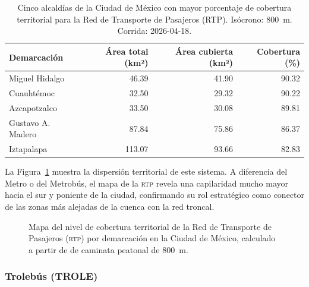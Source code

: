 \begin{table}[H]
    \centering
    \caption[Alcaldías con mayor cobertura de RTP (CDMX)]{
    Cinco alcaldías de la Ciudad de México con mayor porcentaje de cobertura
    territorial para la Red de Transporte de Pasajeros (RTP). Isócrono: 800~m.
    Corrida: 2026-04-18.}
    \label{tab:cobertura-rtp-cdmx}
    \begin{tabular}{|l|r|r|r|}
        \hline
        \textbf{Demarcación} & \textbf{Área total (km²)} & \textbf{Área cubierta (km²)} & \textbf{Cobertura (\%)} \\
        \hline
        Miguel Hidalgo      &  46.39 &  41.90 &  90.32 \\
        Cuauhtémoc          &  32.50 &  29.32 &  90.22 \\
        Azcapotzalco        &  33.50 &  30.08 &  89.81 \\
        Gustavo A. Madero   &  87.84 &  75.86 &  86.37 \\
        Iztapalapa          & 113.07 &  93.66 &  82.83 \\
        \hline
    \end{tabular}
\end{table}

La Figura~\ref{fig:mapa-cobertura-rtp} muestra la dispersión territorial de este
sistema. A diferencia del Metro o del Metrobús, el mapa de la \textsc{rtp} revela
una capilaridad mucho mayor hacia el sur y poniente de la ciudad, confirmando su
rol estratégico como conector de las zonas más alejadas de la cuenca con la red
troncal.

\begin{figure}[H]
    \centering
    \caption[Mapa de cobertura territorial de la RTP en la CDMX]{Mapa del
    nivel de cobertura territorial de la Red de Transporte de Pasajeros
    (\textsc{rtp}) por demarcación en la Ciudad de México, calculado a partir
    de  de caminata peatonal de 800~m.}
    \label{fig:mapa-cobertura-rtp}
\end{figure}

\subsubsection{Trolebús (TROLE)}
\label{subsubsec:cobertura-trole}

